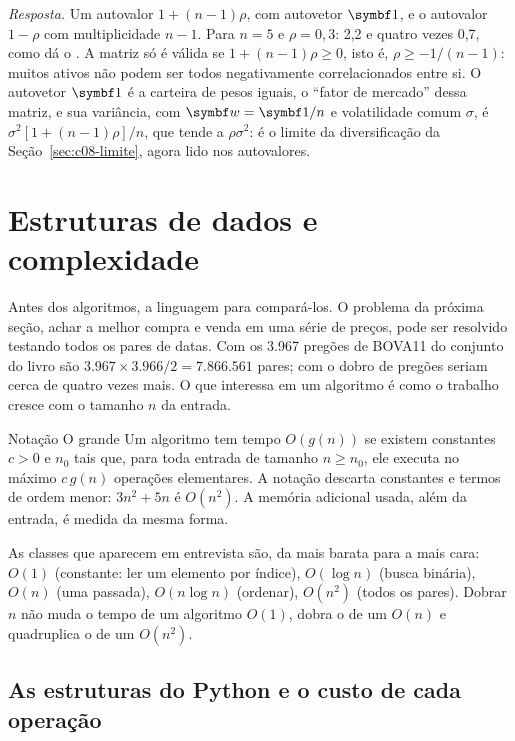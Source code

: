 \emph{Resposta.} Um autovalor $1 + (n-1)\rho$, com autovetor $\vetor{1}$, e o autovalor $1 - \rho$ com multiplicidade $n-1$. Para $n = 5$ e $\rho = 0,3$: 2,2 e quatro vezes 0,7, como dá o . A matriz só é válida se $1 + (n-1)\rho \ge 0$, isto é, $\rho \ge -1/(n-1)$: muitos ativos não podem ser todos negativamente correlacionados entre si. O autovetor $\vetor{1}$ é a carteira de pesos iguais, o ``fator de mercado'' dessa matriz, e sua variância, com $\vetor{w} = \vetor{1}/n$ e volatilidade comum $\sigma$, é $\sigma^2[1 + (n-1)\rho]/n$, que tende a $\rho\sigma^2$: é o limite da diversificação da Seção~\ref{sec:c08-limite}, agora lido nos autovalores.

\section{Estruturas de dados e complexidade}
\label{sec:c16-complexidade}

Antes dos algoritmos, a linguagem para compará-los. O problema da próxima seção, achar a melhor compra e venda em uma série de preços, pode ser resolvido testando todos os pares de datas. Com os 3.967 pregões de BOVA11 do conjunto do livro são $3.967 \times 3.966 / 2 = 7.866.561$ pares; com o dobro de pregões seriam cerca de quatro vezes mais. O que interessa em um algoritmo é como o trabalho cresce com o tamanho $n$ da entrada.

\begin{definicao}{Notação O grande}
Um algoritmo tem tempo $O(g(n))$ se existem constantes $c > 0$ e $n_0$ tais que, para toda entrada de tamanho $n \ge n_0$, ele executa no máximo $c\, g(n)$ operações elementares. A notação descarta constantes e termos de ordem menor: $3n^2 + 5n$ é $O(n^2)$. A memória adicional usada, além da entrada, é medida da mesma forma.
\end{definicao}

As classes que aparecem em entrevista são, da mais barata para a mais cara: $O(1)$ (constante: ler um elemento por índice), $O(\log n)$ (busca binária), $O(n)$ (uma passada), $O(n \log n)$ (ordenar), $O(n^2)$ (todos os pares). Dobrar $n$ não muda o tempo de um algoritmo $O(1)$, dobra o de um $O(n)$ e quadruplica o de um $O(n^2)$.

\subsection{As estruturas do Python e o custo de cada operação}

